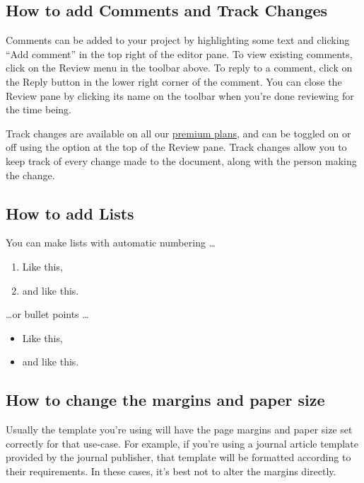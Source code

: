 \documentclass{article}
\begin{document}
\subsection{How to add Comments and Track Changes}

Comments can be added to your project by highlighting some text and clicking ``Add comment'' in the top right of the editor pane. To view existing comments, click on the Review menu in the toolbar above. To reply to a comment, click on the Reply button in the lower right corner of the comment. You can close the Review pane by clicking its name on the toolbar when you're done reviewing for the time being.

Track changes are available on all our \href{https://www.overleaf.com/user/subscription/plans}{premium plans}, and can be toggled on or off using the option at the top of the Review pane. Track changes allow you to keep track of every change made to the document, along with the person making the change. 

\subsection{How to add Lists}

You can make lists with automatic numbering \dots

\begin{enumerate}
\item Like this,
\item and like this.
\end{enumerate}
\dots or bullet points \dots
\begin{itemize}
\item Like this,
\item and like this.
\end{itemize}






\subsection{How to change the margins and paper size}

Usually the template you're using will have the page margins and paper size set correctly for that use-case. For example, if you're using a journal article template provided by the journal publisher, that template will be formatted according to their requirements. In these cases, it's best not to alter the margins directly.
\end{document}

